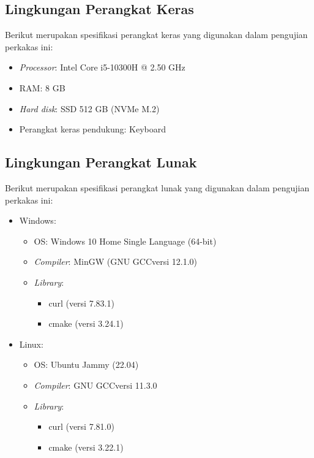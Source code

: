 \subsection{Lingkungan Perangkat Keras}
\label{sec:testing-experiments-hardware}

Berikut merupakan spesifikasi perangkat keras yang digunakan dalam pengujian perkakas ini:

\begin{itemize}
	\item \textit{Processor}: Intel\logoregistered\xspace Core\logotrademark\xspace i5-10300H @ 2.50 GHz
	\item RAM: 8 GB
	\item \textit{Hard disk}: SSD 512 GB (NVMe\logotrademark\xspace M.2)
	\item Perangkat keras pendukung: Keyboard
\end{itemize}

\subsection{Lingkungan Perangkat Lunak}
\label{sec:testing-experiments-software}

Berikut merupakan spesifikasi perangkat lunak yang digunakan dalam pengujian perkakas ini:

\begin{itemize}
	\item Windows:
	
	\begin{itemize}
		\item OS: Windows 10 Home Single Language (64-bit)
		\item \textit{Compiler}: MinGW (GNU GCC\textemdash versi 12.1.0)
		\item \textit{Library}:
		
		\begin{itemize}
			\item curl (versi 7.83.1)
			\item cmake (versi 3.24.1)
		\end{itemize}
		
	\end{itemize}
	
	\item Linux:
	
	\begin{itemize}
		\item OS: Ubuntu Jammy (22.04)
		\item \textit{Compiler}: GNU GCC\textemdash versi 11.3.0
		\item \textit{Library}:
		
		\begin{itemize}
			\item curl (versi 7.81.0)
			\item cmake (versi 3.22.1)
		\end{itemize}
		
	\end{itemize}
	
\end{itemize}

